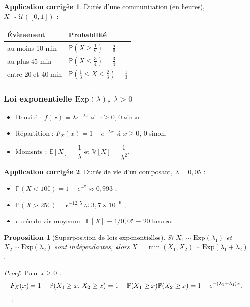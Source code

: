 \documentclass[11pt,a4paper]{article}
\newcommand{\E}{\mathbb{E}}
\newcommand{\V}{\mathbb{V}}
\renewcommand{\P}{\mathbb{P}}
\newcommand{\1}{\mathbf{1}}
\theoremstyle{definition}
\newtheorem*{application}{Application corrigée}
\theoremstyle{plain}
\newtheorem*{proposition}{Proposition}
\theoremstyle{remark}
\begin{document}
\begin{application}
Durée d'une communication (en heures), $X\sim\mathcal{U}([0,1])$ :
\begin{center}
\begin{tabular}{ll}
\toprule
\textbf{Évènement} & \textbf{Probabilité}\\
\midrule
au moins 10 min & $\P(X\ge\tfrac16)=\tfrac56$\\
au plus 45 min & $\P(X\le\tfrac34)=\tfrac34$\\
entre 20 et 40 min & $\P(\tfrac13\le X\le\tfrac23)=\tfrac13$\\
\bottomrule
\end{tabular}
\end{center}
\end{application}

\subsubsection*{Loi exponentielle $\mathrm{Exp}(\lambda)$, $\lambda>0$}

\begin{itemize}
  \item Densité : $f(x)=\lambda e^{-\lambda x}$ si $x\ge0$, $0$ sinon.
  \item Répartition : $F_X(x)=1-e^{-\lambda x}$ si $x\ge0$, $0$ sinon.
  \item Moments : $\E[X]=\dfrac1\lambda$ et $\V[X]=\dfrac1{\lambda^2}$.
\end{itemize}

\begin{application}
Durée de vie d'un composant, $\lambda=0{,}05$ :
\begin{itemize}
  \item $\P(X<100)=1-e^{-5}\approx0{,}993$ ;
  \item $\P(X>250)=e^{-12{,}5}\approx3{,}7\times10^{-6}$ ;
  \item durée de vie moyenne : $\E[X]=1/0{,}05=20$ heures.
\end{itemize}
\end{application}

\begin{proposition}[Superposition de lois exponentielles]
Si $X_1\sim\mathrm{Exp}(\lambda_1)$ et $X_2\sim\mathrm{Exp}(\lambda_2)$ sont indépendantes, alors $X=\min(X_1,X_2)\sim\mathrm{Exp}(\lambda_1+\lambda_2)$.
\end{proposition}

\begin{proof}
Pour $x\ge0$ :
\[
F_X(x)=1-\P(X_1\ge x,\,X_2\ge x)=1-\P(X_1\ge x)\P(X_2\ge x)=1-e^{-(\lambda_1+\lambda_2)x}.\qedhere
\]
\end{proof}
\end{document}

